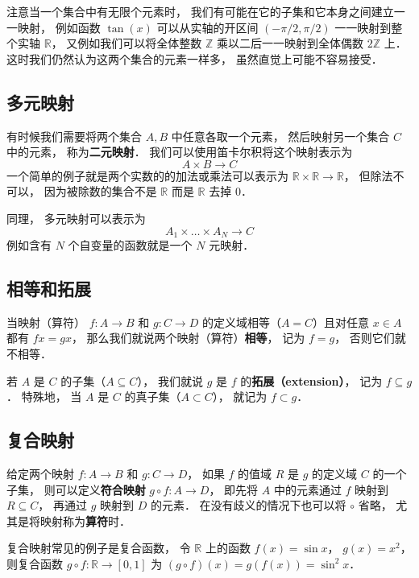注意当一个集合中有无限个元素时， 我们有可能在它的子集和它本身之间建立一一映射， 例如函数 $\tan(x)$ 可以从实轴的开区间 $(-\pi/2, \pi/2)$ 一一映射到整个实轴 $\mathbb R$， 又例如我们可以将全体整数 $\mathbb Z$ 乘以二后一一映射到全体偶数 $2\mathbb Z$ 上． 这时我们仍然认为这两个集合的元素一样多， 虽然直觉上可能不容易接受．

\subsection{多元映射}
有时候我们需要将两个集合 $A, B$ 中任意各取一个元素， 然后映射另一个集合 $C$ 中的元素， 称为\textbf{二元映射}． 我们可以使用笛卡尔积将这个映射表示为
\begin{equation}
A \times B \to C
\end{equation}
一个简单的例子就是两个实数的的加法或乘法可以表示为 $\mathbb R \times \mathbb R \to \mathbb R$， 但除法不可以， 因为被除数的集合不是 $\mathbb R$ 而是 $\mathbb R$ 去掉 $0$．

同理， 多元映射可以表示为
\begin{equation}
A_1 \times \dots \times A_N \to C
\end{equation}
例如含有 $N$ 个自变量的函数就是一个 $N$ 元映射．

\subsection{相等和拓展}
当映射（算符） $f:A\to B$ 和 $g:C\to D$ 的定义域相等（$A = C$）且对任意 $x\in A$ 都有 $fx = gx$， 那么我们就说两个映射（算符）\textbf{相等}， 记为 $f = g$， 否则它们就不相等．

若 $A$ 是 $C$ 的子集（$A\subseteq C$）， 我们就说 $g$ 是 $f$ 的\textbf{拓展（extension）}， 记为 $f \subseteq g$． 特殊地， 当 $A$ 是 $C$ 的真子集（$A\subset C$）， 就记为 $f \subset g$．

\subsection{复合映射}
给定两个映射 $f:A\to B$ 和 $g:C\to D$， 如果 $f$ 的值域 $R$ 是 $g$ 的定义域 $C$ 的一个子集， 则可以定义\textbf{符合映射} $g\circ f: A\to D$， 即先将 $A$ 中的元素通过 $f$ 映射到 $R \subseteq C$， 再通过 $g$ 映射到 $D$ 的元素． 在没有歧义的情况下也可以将 $\circ$ 省略， 尤其是将映射称为\textbf{算符}时．

复合映射常见的例子是复合函数， 令 $\mathbb R$ 上的函数 $f(x) = \sin x$， $g(x) = x^2$， 则复合函数 $g\circ f: \mathbb R \to [0, 1]$ 为 $(g\circ f)(x) = g(f(x)) = \sin^2 x$．

